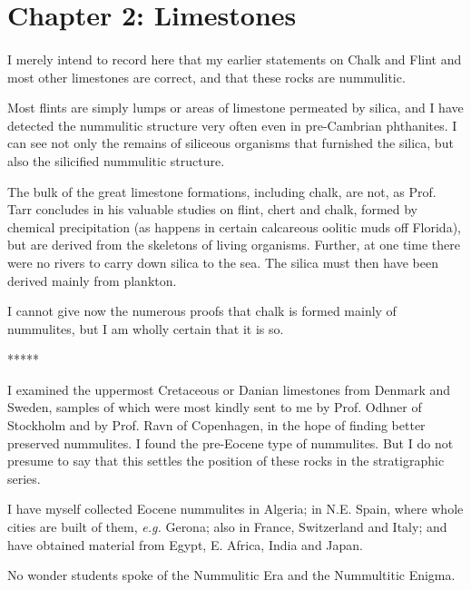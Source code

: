 \documentclass[a4paper, 12pt, oneside]{article}
\begin{document}
\clearpage
\section{Chapter 2: Limestones}
\paragraph{}
I merely intend to record here that my earlier statements on Chalk and Flint and most other limestones are correct, and that these rocks are nummulitic.

Most flints are simply lumps or areas of limestone permeated by silica, and I have detected the nummulitic structure very often even in pre-Cambrian phthanites. I can see not only the remains of siliceous organisms that furnished the silica, but also the silicified nummulitic structure.

The bulk of the great limestone formations, including chalk, are not, as Prof. Tarr concludes in his valuable studies on flint, chert and chalk, formed by chemical precipitation (as happens in certain calcareous oolitic muds off Florida), but are derived from the skeletons of living organisms. Further, at one time there were no rivers to carry down silica to the sea. The silica must then have been derived mainly from plankton.

I cannot give now the numerous proofs that chalk is formed mainly of nummulites, but I am wholly certain that it is so.

\centerline{*\hspace{15mm}*\hspace{15mm}*\hspace{15mm}*\hspace{15mm}*}
\bigskip

I examined the uppermost Cretaceous or Danian limestones from Denmark and Sweden, samples of which were most kindly sent to me by Prof. Odhner of Stockholm and by Prof. Ravn of Copenhagen, in the hope of finding better preserved nummulites. I found the pre-Eocene type of nummulites. But I do not presume to say that this settles the position of these rocks in the stratigraphic series.

I have myself collected Eocene nummulites in Algeria; in N.E. Spain, where whole cities are built of them, \emph{e.g.} Gerona; also in France, Switzerland and Italy; and have obtained material from Egypt, E. Africa, India and Japan.

No wonder students spoke of the Nummulitic Era and the Nummultitic Enigma.
\end{document}
